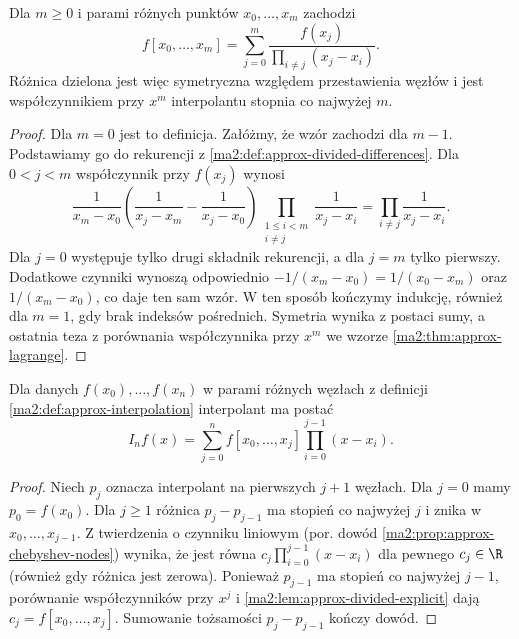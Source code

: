 \begin{lemat}
\label{ma2:lem:approx-divided-explicit}
Dla $m\ge0$ i parami różnych punktów
$x_0,\ldots,x_m$ zachodzi
\[
 f[x_0,\ldots,x_m]=
 \sum_{j=0}^m
 \frac{f(x_j)}{\prod_{i\ne j}(x_j-x_i)}.
\]
Różnica dzielona jest więc symetryczna
względem przestawienia węzłów i jest
współczynnikiem przy $x^m$ interpolantu
stopnia co najwyżej $m$.
\end{lemat}
\begin{proof}
Dla $m=0$ jest to definicja.
Załóżmy, że wzór zachodzi dla $m-1$.
Podstawiamy go do rekurencji z
\ref{ma2:def:approx-divided-differences}.
Dla $0<j<m$ współczynnik przy $f(x_j)$
wynosi
\[
 \frac{1}{x_m-x_0}
 \left(\frac1{x_j-x_m}-\frac1{x_j-x_0}\right)
 \prod_{\substack{1\le i<m\\i\ne j}}
 \frac1{x_j-x_i}
 =\prod_{i\ne j}\frac1{x_j-x_i}.
\]
Dla $j=0$ występuje tylko drugi składnik
rekurencji, a dla $j=m$ tylko pierwszy.
Dodatkowe czynniki wynoszą odpowiednio
$-1/(x_m-x_0)=1/(x_0-x_m)$
oraz $1/(x_m-x_0)$, co daje ten sam wzór.
W ten sposób kończymy indukcję, również
dla $m=1$, gdy brak indeksów pośrednich.
Symetria wynika z postaci sumy, a ostatnia
teza z porównania współczynnika przy $x^m$
we wzorze \ref{ma2:thm:approx-lagrange}.
\end{proof}

\begin{twierdzenie}
\label{ma2:thm:approx-newton}
Dla danych $f(x_0),\ldots,f(x_n)$ w parami
różnych węzłach z definicji
\ref{ma2:def:approx-interpolation}
interpolant ma postać
\[
 I_nf(x)=\sum_{j=0}^n f[x_0,\ldots,x_j]
                \prod_{i=0}^{j-1}(x-x_i).
\]
\end{twierdzenie}
\begin{proof}
Niech $p_j$ oznacza interpolant na pierwszych
$j+1$ węzłach. Dla $j=0$ mamy $p_0=f(x_0)$.
Dla $j\ge1$ różnica $p_j-p_{j-1}$ ma stopień
co najwyżej $j$ i znika w $x_0,\ldots,x_{j-1}$.
Z twierdzenia o czynniku liniowym
(por. dowód \ref{ma2:prop:approx-chebyshev-nodes}) wynika,
że jest równa $c_j\prod_{i=0}^{j-1}(x-x_i)$
dla pewnego $c_j\in\R$ (również gdy różnica
jest zerowa).
Ponieważ $p_{j-1}$ ma stopień co najwyżej $j-1$,
porównanie współczynników przy $x^j$ i
\ref{ma2:lem:approx-divided-explicit}
dają $c_j=f[x_0,\ldots,x_j]$.
Sumowanie tożsamości $p_j-p_{j-1}$
kończy dowód.
\end{proof}

